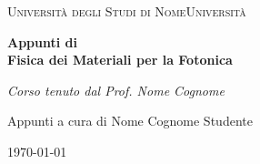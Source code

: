 \documentclass[11pt,a4paper]{book}
\begin{document}
\begin{titlepage}
    \centering
    \vspace*{2cm}
    
    {\scshape\LARGE Università degli Studi di NomeUniversità \par}
    \vspace{1.5cm}
    {\Huge\bfseries Appunti di\\[0.5cm]
    Fisica dei Materiali per la Fotonica\par}
    \vspace{2cm}
    {\Large\itshape Corso tenuto dal Prof. Nome Cognome\par}
    \vfill
    {\large Appunti a cura di Nome Cognome Studente\par}
    \vspace{0.5cm}
    {\large \today\par}
\end{titlepage}

\tableofcontents
\newpage


% 

% 
% 
\end{document}
